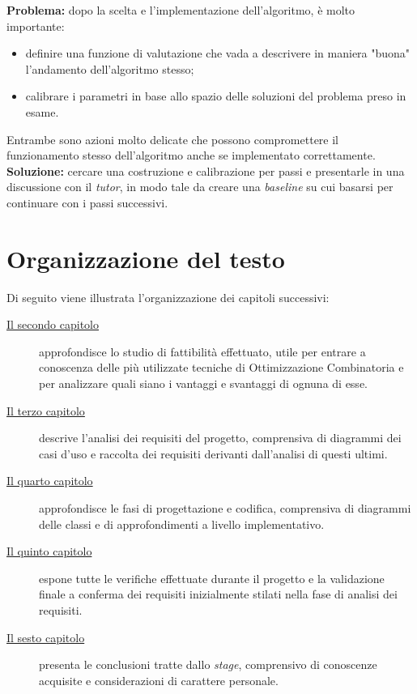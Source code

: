 \begin{enumerate}
    \textbf{Problema:} dopo la scelta e l'implementazione dell'algoritmo, è molto importante:
    \begin{itemize}
        \item definire una funzione di valutazione che vada a descrivere in maniera "buona" l'andamento dell'algoritmo stesso;
        \item calibrare i parametri in base allo spazio delle soluzioni del problema preso in esame.
    \end{itemize}
    Entrambe sono azioni molto delicate che possono compromettere il funzionamento stesso dell'algoritmo anche
    se implementato correttamente.\\[0.2cm]
    \textbf{Soluzione:} cercare una costruzione e calibrazione per passi e presentarle in una discussione con il \textit{tutor},
    in modo tale da creare una \textit{baseline} su cui basarsi per continuare con i passi successivi.

\end{enumerate}

\noindent
\section{Organizzazione del testo}
\noindent Di seguito viene illustrata l'organizzazione dei capitoli successivi:
\begin{description}
    \item[{\hyperref[cap:studio-fattibilita]{Il secondo capitolo}}] 
    approfondisce lo studio di fattibilità effettuato, utile per entrare a conoscenza
    delle più utilizzate tecniche di Ottimizzazione Combinatoria e per analizzare
    quali siano i vantaggi e svantaggi di ognuna di esse.
    
    \item[{\hyperref[cap:analisi-requisiti]{Il terzo capitolo}}]
    descrive l'analisi dei requisiti del progetto, comprensiva di diagrammi dei
    casi d'uso e raccolta dei requisiti derivanti dall'analisi di questi ultimi.
    
    \item[{\hyperref[cap:progettazione-codifica]{Il quarto capitolo}}]
    approfondisce le fasi di progettazione e codifica, comprensiva di diagrammi delle classi
    e di approfondimenti a livello implementativo.
    
    \item[{\hyperref[cap:verifica-validazione]{Il quinto capitolo}}]
    espone tutte le verifiche effettuate durante il progetto e la validazione
    finale a conferma dei requisiti inizialmente stilati nella fase di
    analisi dei requisiti.
    
    \item[{\hyperref[cap:conclusioni]{Il sesto capitolo}}]
    presenta le conclusioni tratte dallo \textit{stage}, comprensivo di conoscenze
    acquisite e considerazioni di carattere personale.
\end{description}